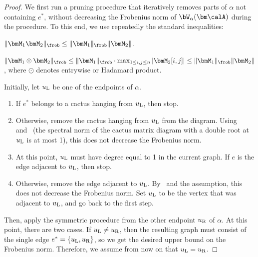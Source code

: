 \begin{proof}
    We first
    run a pruning procedure that iteratively removes parts of $\alpha$ not containing
    $e^*$, without decreasing the
    Frobenius norm of $\bW_\alpha(\bm \calA)$
    during the procedure.
    To this end, we use repeatedly the standard inequalities:

    \begin{claim}    
    \label{claim:frobenius-product}
        $\|\bmM_1 \bmM_2\|_\frob\le \|\bmM_1\|_\frob \|\bmM_2\|$.
    \end{claim}
    
    \begin{claim}
    \label{claim:frobenius-hadamard}
    $\|\bmM_1 \odot \bmM_2\|_\frob\le \|\bmM_1\|_\frob\cdot  \max_{1\le i,j\le n} \left|\bmM_2[i,j]\right|\le \|\bmM_1\|_\frob \|\bmM_2\|$, where $\odot$ denotes entrywise or Hadamard product.
    \end{claim}
    
    Initially, let $u_{\textnormal L}$
    be one of the endpoints of $\alpha$.
    \begin{enumerate}
        \item If $e^*$ belongs to a
        cactus hanging from $u_{\textnormal L}$, then stop.
        \item Otherwise, remove
        the cactus hanging from $u_{\textnormal L}$ from the diagram. Using~ and~ 
        (the spectral norm of the cactus matrix
        diagram with a double root at $u_{\textnormal L}$ is at most 1), this does not 
        decrease
        the Frobenius norm. 
        \item At this point, $u_{\textnormal L}$ must have degree equal to 1 in the current graph. If $e$ is the edge 
        adjacent to $u_{\textnormal L}$, then stop. 
        \item Otherwise, remove the edge
        adjacent to $u_{\textnormal L}$.
        By~ and the assumption, this does not decrease the
        Frobenius norm. Set $u_{\textnormal L}$ to be the
        vertex that was adjacent to
        $u_{\textnormal L}$, and go
        back to the first step.
    \end{enumerate}
    Then, apply the symmetric procedure
    from the other endpoint $u_{\textnormal R}$ of $\alpha$. At
    this point, there are two cases. If $u_{\textnormal L} \neq u_{\textnormal R}$, then the resulting graph
    must consist of the single edge
    $e^* = \{u_{\textnormal L}, u_{\textnormal R}\}$, so we get
    the desired upper bound on the Frobenius norm. Therefore, we
    assume from now on that $u_{\textnormal L} = u_{\textnormal R}$.
    

\end{proof}
